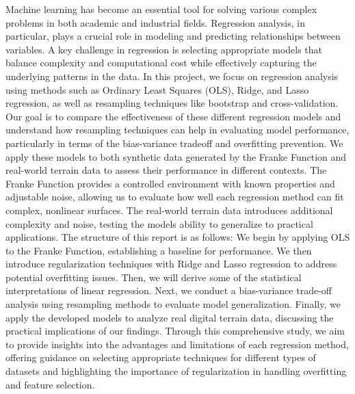 \documentclass{article}
\begin{document}
Machine learning has become an essential tool for solving various complex problems in both academic and industrial fields. Regression analysis, in particular, plays a crucial role in modeling and predicting relationships between variables. A key challenge in regression is selecting appropriate models that balance complexity and computational cost while effectively capturing the underlying patterns in the data.
\newline\newline
In this project, we focus on regression analysis using methods such as Ordinary Least Squares (OLS), Ridge, and Lasso regression, as well as resampling techniques like bootstrap and cross-validation. Our goal is to compare the effectiveness of these different regression models and understand how resampling techniques can help in evaluating model performance, particularly in terms of the bias-variance tradeoff and overfitting prevention.
\newline\newline
We apply these models to both synthetic data generated by the Franke Function and real-world terrain data to assess their performance in different contexts. The Franke Function provides a controlled environment with known properties and adjustable noise, allowing us to evaluate how well each regression method can fit complex, nonlinear surfaces. The real-world terrain data introduces additional complexity and noise, testing the models ability to generalize to practical applications.
\newline\newline
The structure of this report is as follows: We begin by applying OLS to the Franke Function, establishing a baseline for performance. We then introduce regularization techniques with Ridge and Lasso regression to address potential overfitting issues. Then, we will derive some of the statistical interpretations of linear regression. Next, we conduct a bias-variance trade-off analysis using resampling methods to evaluate model generalization. Finally, we apply the developed models to analyze real digital terrain data, discussing the practical implications of our findings.
\newline\newline
Through this comprehensive study, we aim to provide insights into the advantages and limitations of each regression method, offering guidance on selecting appropriate techniques for different types of datasets and highlighting the importance of regularization in handling overfitting and feature selection.  
\end{document}
